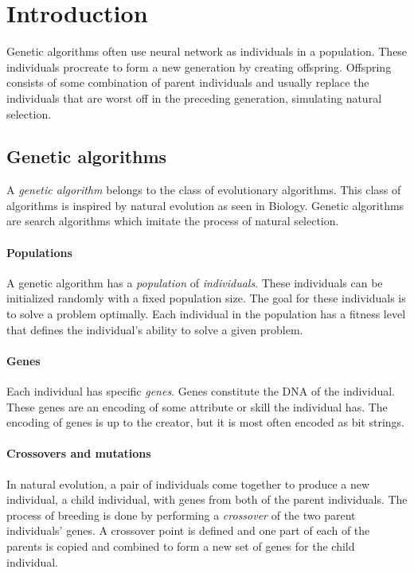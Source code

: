 \section{Introduction}
Genetic algorithms often use neural network as individuals in a population. These individuals procreate to form a new generation by creating offspring. Offspring consists of some combination of parent individuals and usually replace the individuals that are worst off in the preceding generation, simulating natural selection.

\subsection{Genetic algorithms}

A \emph{genetic algorithm} belongs to the class of evolutionary algorithms. This class of algorithms is inspired by natural evolution as seen in Biology. Genetic algorithms are search algorithms which imitate the process of natural selection.

\paragraph{Populations}

A genetic algorithm has a \emph{population} of \emph{individuals}. These individuals can be initialized randomly with a fixed population size.
The goal for these individuals is to solve a problem optimally. Each individual in the population has a fitness level that defines the individual's ability to solve a given problem.

\paragraph{Genes}

Each individual has specific \emph{genes}. Genes constitute the DNA of the individual. These genes are an encoding of some attribute or skill the individual has. The encoding of genes is up to the creator, but it is most often encoded as bit strings.

\paragraph{Crossovers and mutations}

In natural evolution, a pair of individuals come together to produce a new individual, a child individual, with genes from both of the parent individuals. The process of breeding is done by performing a \emph{crossover} of the two parent individuals' genes. A crossover point is defined and one part of each of the parents is copied and combined to form a new set of genes for the child individual.

